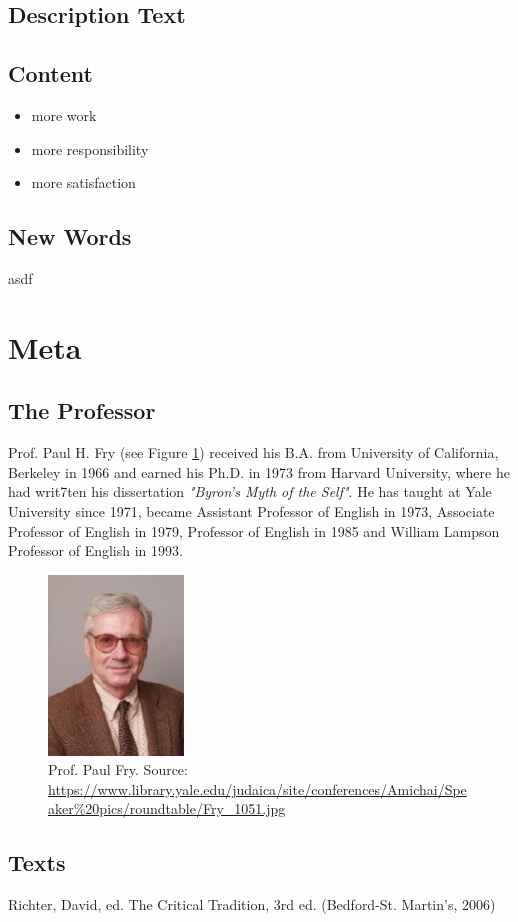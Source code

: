\documentclass[]{scrartcl}
\begin{document}
\subsection{Description Text}


\subsection{Content}

\begin{itemize}
\item more work
\item more responsibility
\item more satisfaction
\end{itemize}


\subsection{New Words}

\begin{description}[leftmargin=!,labelwidth=\widthof{\bfseries Cartesian Revolution}]
  \item[Literature] asdf
\end{description}

\newpage





\section{Meta}
\subsection{The Professor}
Prof. Paul H. Fry (see Figure \ref{fig:paul_fry}) received his B.A. from University of California, Berkeley in 1966 and earned his Ph.D. in 1973 from Harvard University, where he had writ7ten his dissertation \emph{"Byron’s Myth of the Self"}. He has taught at Yale University since 1971, became Assistant Professor of English in 1973, Associate Professor of English in 1979, Professor of English in 1985 and William Lampson Professor of English in 1993.

\begin{figure}[]
	\centering
	\includegraphics[width=0.32\textwidth]{images/paul_fry.jpg}
	\caption{Prof. Paul Fry. Source: \url{https://www.library.yale.edu/judaica/site/conferences/Amichai/Speaker\%20pics/roundtable/Fry_1051.jpg}}
	\label{fig:paul_fry}
\end{figure}

\subsection{Texts}

Richter, David, ed. The Critical Tradition, 3rd ed. (Bedford-St. Martin's, 2006)
\end{document}
